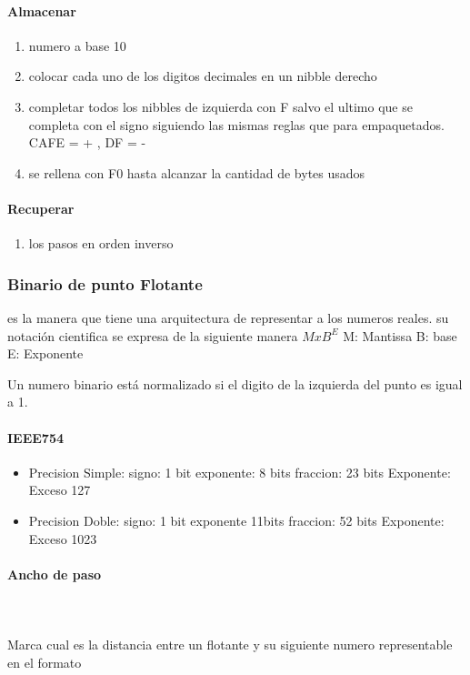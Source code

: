 \paragraph{Almacenar}
\begin{enumerate}
\item numero a base 10
\item colocar cada uno de los digitos decimales en un nibble derecho
\item completar todos los nibbles de izquierda con F salvo el ultimo que se completa con el signo siguiendo las mismas reglas que para empaquetados.  CAFE = + , DF = -
\item se rellena con F0 hasta alcanzar la cantidad de bytes usados
\end{enumerate}
\paragraph{Recuperar}
\begin{enumerate}
\item los pasos en orden inverso
\end{enumerate}

\subsubsection{Binario de punto Flotante}
es la manera que tiene una arquitectura de representar a los numeros reales.
su notación cientifica se expresa de la siguiente manera $M x B^E$
M: Mantissa B: base E: Exponente

Un numero binario está normalizado si el digito de la izquierda del punto es igual a 1.

\paragraph{IEEE754}
\begin{itemize}
\item Precision Simple: signo: 1 bit exponente: 8 bits fraccion: 23 bits Exponente: Exceso 127
\item Precision Doble: signo: 1 bit exponente 11bits fraccion: 52 bits Exponente: Exceso 1023
\end{itemize}

\paragraph{Ancho de paso}\mbox{}\\\\
Marca cual es la distancia entre un flotante y su siguiente numero representable en el formato

